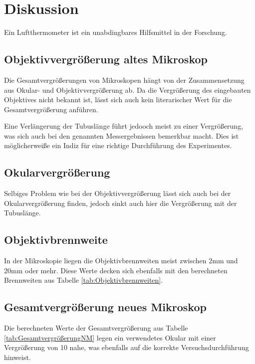 \documentclass[12pt,a4paper,twoside]{article}
\begin{document}
\section{Diskussion} %

Ein Luftthermometer ist ein unabdingbares Hilfsmittel in der Forschung. 

\subsection{Objektivvergrößerung altes Mikroskop}

Die Gesamtvergrößerungen von Mikroskopen hängt von der Zusammensetzung aus Okular- und Objektivvergrößerung ab.
Da die Vergrößerung des eingebauten Objektives nicht bekannt ist, lässt sich auch kein literarischer Wert für die Gesamtvergrößerung anführen. \newline

\noindent
Eine Verlängerung der Tubuslänge führt jedooch meist zu einer Vergrößerung, was sich auch bei den genannten Messergebnissen bemerkbar macht. 
Dies ist möglicherweiße ein Indiz für eine richtige Durchführung des Experimentes. 

\subsection{Okularvergrößerung}

Selbiges Problem wie bei der Objektivvergrößerung lässt sich auch bei der Okularvergrößerung finden, jedoch sinkt auch hier die Vergrößerung mit der Tubuslänge. 


\subsection{Objektivbrennweite}

In der Mikroskopie liegen die Objektivbrennweiten meist zwischen 2mm und 20mm oder mehr. Diese Werte decken sich ebenfalls mit den berechneten Brennweiten aus Tabelle \ref{tab:Objektivbrennweiten}.


\subsection{Gesamtvergrößerung neues Mikroskop}

Die berechneten Werte der Gesamtvergrößerung aus Tabelle \ref{tab:GesamtvergrößerungNM} legen ein verwendetes Okular mit einer Vergrößerung von 10 nahe, was ebenfalls auf die korrekte Versuchsdurchführung hinweist.
\end{document}
